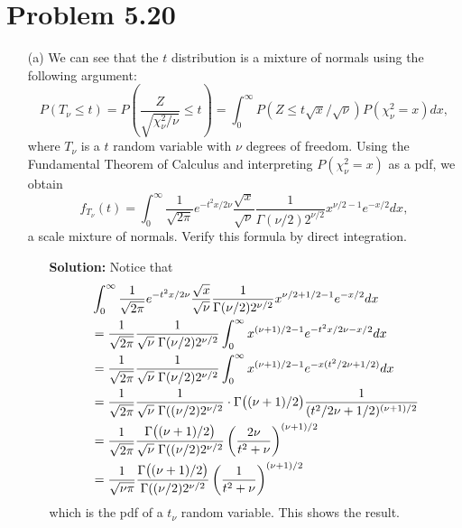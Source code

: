 \documentclass[11pt]{article}
\begin{document}
\newpage
\section*{Problem 5.20}
\begin{itemize}
\item[(a)] We can see that the $t$ distribution is a mixture of normals using the following argument:
\[
P(T_\nu \leq t) = P\left(\frac{Z}{\sqrt{\chi^2_\nu / \nu}}\leq t\right) = \int_0^\infty P(Z \leq t\sqrt{x}/\sqrt{\nu})P(\chi^2_\nu = x)dx,
\]
where $T_\nu$ is a $t$ random variable with $\nu$ degrees of freedom.  Using the Fundamental Theorem of Calculus and interpreting $P(\chi^2_\nu = x)$ as a pdf, we obtain
\[
f_{T_\nu}(t) = \int_0^\infty \frac{1}{\sqrt{2\pi}}e^{-t^2x/2\nu}\frac{\sqrt{x}}{\sqrt{\nu}}\frac{1}{\Gamma(\nu/2)2^{\nu/2}}x^{\nu/2-1}e^{-x/2}dx,
\]
a scale mixture of normals.  Verify this formula by direct integration.
\begin{itemize}
\item[] \textbf{Solution:}  Notice that
\begin{align*}
&\int_0^\infty \frac{1}{\sqrt{2\pi}}e^{-t^2x/2\nu}\frac{\sqrt{x}}{\sqrt{\nu}}\frac{1}{\Gamma(\nu/2)2^{\nu/2}}x^{\nu/2+1/2-1}e^{-x/2}dx \\
&= \frac{1}{\sqrt{2\pi}}\frac{1}{\sqrt{\nu}\hspace{1mm}\Gamma(\nu/2)2^{\nu/2}}\int_0^\infty x^{(\nu+1)/2-1}e^{ -t^2x/2\nu - x/2}dx \\
&= \frac{1}{\sqrt{2\pi}}\frac{1}{\sqrt{\nu}\hspace{1mm}\Gamma(\nu/2)2^{\nu/2}}\int_0^\infty x^{(\nu+1)/2-1}e^{ -x(t^2/2\nu + 1/2)}dx \\
&= \frac{1}{\sqrt{2\pi}}\frac{1}{\sqrt{\nu}\hspace{1mm}\Gamma((\nu/2)2^{\nu/2}}\cdot  \Gamma\big{(}(\nu+1)/2\big{)}\frac{1}{(t^2/2\nu + 1/2)^{(\nu+1)/2}} \\
&= \frac{1}{\sqrt{2\pi}}\frac{ \Gamma\big{(}(\nu+1)/2\big{)}}{\sqrt{\nu}\hspace{1mm}\Gamma((\nu/2)2^{\nu/2}} \left(\frac{2\nu}{t^2+\nu}\right)^{(\nu+1)/2} \\
&= \frac{1}{\sqrt{\nu\pi}}\frac{ \Gamma\big{(}(\nu+1)/2\big{)}}{\Gamma((\nu/2)2^{\nu/2}} \left(\frac{1}{t^2+\nu}\right)^{(\nu+1)/2}
\end{align*}
which is the pdf of a $t_\nu$ random variable.  This shows the result.
\end{itemize}


\end{itemize}
\end{document}
